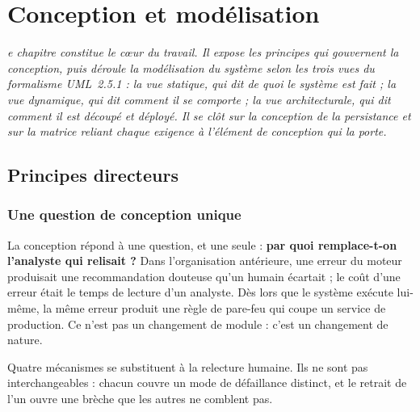 \let\textcircled=\pgftextcircled
\chapter{Conception et mod\'elisation}
\label{chap:conception}

\textit{e chapitre constitue le c\oe ur du travail. Il expose les
principes qui gouvernent la conception, puis d\'eroule la mod\'elisation du syst\`eme
selon les trois vues du formalisme UML~2.5.1 : la vue statique, qui dit de quoi le
syst\`eme est fait ; la vue dynamique, qui dit comment il se comporte ; la vue
architecturale, qui dit comment il est d\'ecoup\'e et d\'eploy\'e. Il se cl\^ot sur la
conception de la persistance et sur la matrice reliant chaque exigence \`a
l'\'el\'ement de conception qui la porte.}

\minitoc
\newpage

\section{Principes directeurs}

\subsection{Une question de conception unique}
La conception r\'epond \`a une question, et une seule : \textbf{par quoi remplace-t-on
l'analyste qui relisait ?} Dans l'organisation ant\'erieure, une erreur du moteur
produisait une recommandation douteuse qu'un humain \'ecartait ; le co\^ut d'une
erreur \'etait le temps de lecture d'un analyste. D\`es lors que le syst\`eme ex\'ecute
lui-m\^eme, la m\^eme erreur produit une r\`egle de pare-feu qui coupe un service de
production. Ce n'est pas un changement de module : c'est un changement de nature.

Quatre m\'ecanismes se substituent \`a la relecture humaine. Ils ne sont pas
interchangeables : chacun couvre un mode de d\'efaillance distinct, et le retrait de
l'un ouvre une br\`eche que les autres ne comblent pas.

